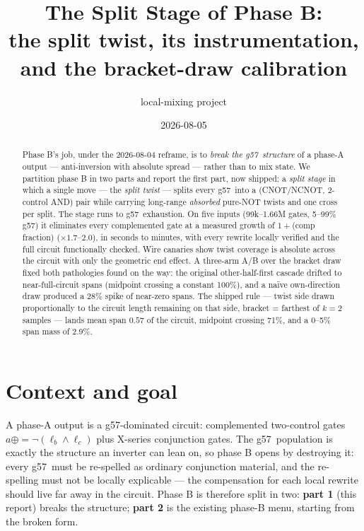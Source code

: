 \documentclass[11pt]{article}
\title{The Split Stage of Phase B:\\
\large the split twist, its instrumentation, and the bracket-draw calibration}
\author{local-mixing project}
\date{2026-08-05}
\newcommand{\g}{\textsf{g57}}
\begin{document}
\maketitle

\begin{abstract}
Phase B's job, under the 2026-08-04 reframe, is to \emph{break the \g\ structure}
of a phase-A output --- anti-inversion with absolute spread --- rather than to mix
state. We partition phase B in two parts and report the first part, now shipped:
a \emph{split stage} in which a single move --- the \emph{split twist} --- splits
every \g\ into a (CNOT/NCNOT, 2-control AND) pair while carrying long-range
\emph{absorbed} pure-NOT twists and one cross per split. The stage runs to \g\
exhaustion. On five inputs (99k--1.66M gates, 5--99\% \g) it eliminates every
complemented gate at a measured growth of $1{+}$(comp fraction) ($\times1.7$--$2.0$),
in seconds to minutes, with every rewrite locally verified and the full circuit
functionally checked. Wire canaries show twist coverage is absolute across the
circuit with only the geometric end effect. A three-arm A/B over the bracket draw
fixed both pathologies found on the way: the original other-half-first cascade
drifted to near-full-circuit spans (midpoint crossing a constant 100\%), and a
na\"ive own-direction draw produced a 28\% spike of near-zero spans. The shipped
rule --- twist side drawn proportionally to the circuit length remaining on that
side, bracket = farthest of $k{=}2$ samples --- lands mean span $0.57$ of the
circuit, midpoint crossing 71\%, and a 0--5\% span mass of 2.9\%.
\end{abstract}

\section{Context and goal}

A phase-A output is a \g-dominated circuit: complemented two-control gates
$a \mathbin{\oplus\!=} \lnot(\ell_b \wedge \ell_c)$ plus X-series conjunction
gates. The \g\ population is exactly the structure an inverter can lean on, so
phase B opens by destroying it: every \g\ must be re-spelled as ordinary
conjunction material, and the re-spelling must not be locally explicable ---
the compensation for each local rewrite should live far away in the circuit.
Phase B is therefore split in two: \textbf{part 1} (this report) breaks the
structure; \textbf{part 2} is the existing phase-B menu, starting from the
broken form.
\end{document}
